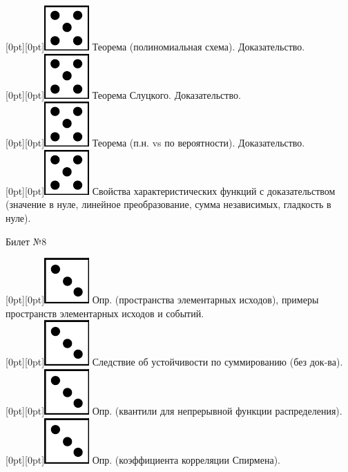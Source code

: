 \documentclass[10pt]{article}
\begin{document}
\raisebox{-1pt}[0pt][0pt]{\includegraphics[width=0.02\linewidth]{5.png}} Теорема (полиномиальная схема). Доказательство. \\

\raisebox{-1pt}[0pt][0pt]{\includegraphics[width=0.02\linewidth]{5.png}} Теорема Слуцкого. Доказательство. \\

\raisebox{-1pt}[0pt][0pt]{\includegraphics[width=0.02\linewidth]{5.png}} Теорема (п.н. vs по вероятности). Доказательство. \\

\raisebox{-1pt}[0pt][0pt]{\includegraphics[width=0.02\linewidth]{5.png}} Свойства характеристических функций с доказательством (значение в нуле, линейное преобразование, сумма независимых, гладкость в нуле). \\

\begin{center} {\Large Билет №8} \end{center} 

\raisebox{-1pt}[0pt][0pt]{\includegraphics[width=0.02\linewidth]{3.png}} Опр. (пространства элементарных исходов), примеры пространств элементарных исходов и событий. \\

\raisebox{-1pt}[0pt][0pt]{\includegraphics[width=0.02\linewidth]{3.png}} Следствие об устойчивости по суммированию (без док-ва). \\

\raisebox{-1pt}[0pt][0pt]{\includegraphics[width=0.02\linewidth]{3.png}}   Опр. (квантили для непрерывной функции распределения). \\

\raisebox{-1pt}[0pt][0pt]{\includegraphics[width=0.02\linewidth]{3.png}} Опр. (коэффициента корреляции Спирмена). \\
\end{document}
